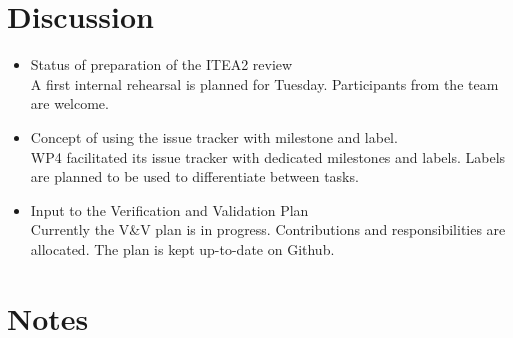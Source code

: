 \documentclass[a4paper, 11pt]{article}
\begin{document}
\section{Discussion}
\begin{itemize}
\item Status of preparation of the ITEA2 review\\
A first internal rehearsal is planned for Tuesday. Participants from the team are welcome. 
\item Concept of using the issue tracker with milestone and label.\\
WP4 facilitated its issue tracker with dedicated milestones and labels. Labels are planned to be used to differentiate between tasks.\\ 
\item Input to the Verification and Validation Plan\\
Currently the V\&V plan is in progress. Contributions and responsibilities are allocated. The plan is kept up-to-date on Github.\\

\end{itemize}


\section{Notes}
\end{document}
